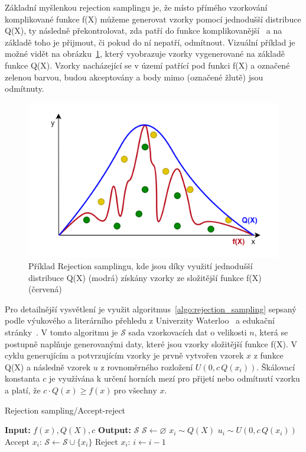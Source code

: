 Základní myšlenkou rejection samplingu je, že místo přímého vzorkování komplikované funkce f(X) můžeme generovat vzorky pomocí jednodušší distribuce Q(X), ty následně překontrolovat, zda patří do funkce komplikovanější~\cite{ghojogh2020sampling} a na základě toho je přijmout, či pokud do ní nepatří, odmítnout. Vizuální příklad je možné vidět na obrázku~\ref{fig:RA_graph}, který vyobrazuje vzorky vygenerované na základě funkce Q(X). Vzorky nacházející se v území patřící pod funkci f(X) a označené zelenou barvou, budou akceptovány a body mimo (označené žlutě) jsou odmítnuty.

\begin{figure}[H]
    \centering
    \includegraphics[width=\textwidth]{obrazky-figures/ch2/RA_graph.png}
    \caption{Příklad Rejection samplingu, kde jsou díky využití jednodušší distribuce Q(X) (modrá) získány vzorky ze složitější funkce f(X) (červená)}
    \label{fig:RA_graph}
\end{figure}

Pro detailnější vysvětlení je využit algoritmus~\ref{algo:rejection_sampling} sepsaný podle výukového a literárního přehledu z Univerzity Waterloo~\cite{ghojogh2020sampling} a edukační stránky~\cite{Sachdeva_2021}. V tomto algoritmu je $\mathcal{S}$ sada vzorkovacích dat o velikosti $n$, která se postupně naplňuje generovanými daty, které jsou vzorky složitější funkce f(X). V cyklu generujícím a potvrzujícím vzorky je prvně vytvořen vzorek $x$ z funkce Q(X) a následně vzorek $u$ z rovnoměrného rozložení $U(0, c\, Q(x_i))$. Škálovací konstanta $c$ je využívána k určení horních mezí pro přijetí nebo odmítnutí vzorku a platí, že $c \cdot Q(x) \geq f(x) \ \text{pro všechny } x$.
\label{eq:RA_c}
\begin{algorithm}[h]
\caption{Rejection sampling/Accept-reject}\label{algo:rejection_sampling}
\begin{algorithmic}[1]
    \State \textbf{Input:} $f(x), Q(X), c$\;
    \State \textbf{Output:} $\mathcal{S}$
    \State $\mathcal{S} \gets \varnothing$
        \State $x_i \sim Q(X)$
        \State $u_i \sim U(0, c\, Q(x_i))$
            \State Accept $x_i$: $\mathcal{S} \gets \mathcal{S} \cup \{x_i\}$
        \Else
            \State Reject $x_i$: $i \gets i - 1$
        \EndIf
    \EndFor
\end{algorithmic}
\end{algorithm}

